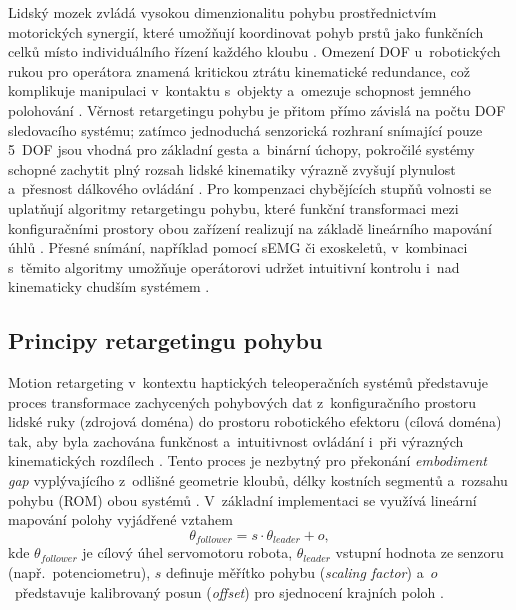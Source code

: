 \documentclass[FZS,DP]{tulthesis}
\begin{document}
Lidský mozek zvládá vysokou dimenzionalitu pohybu prostřednictvím motorických synergií, které umožňují koordinovat pohyb prstů jako funkčních celků místo individuálního řízení každého kloubu \cite{Mizrahi2023, Xiong2024, Zhang2025}.
Omezení DOF u~robotických rukou pro operátora znamená kritickou ztrátu kinematické redundance, což komplikuje manipulaci v~kontaktu s~objekty a~omezuje schopnost jemného polohování \cite{Belcamino2024, GIUDICI2025}.
Věrnost retargetingu pohybu je přitom přímo závislá na počtu DOF sledovacího systému; zatímco jednoduchá senzorická rozhraní snímající pouze 5~DOF jsou vhodná pro základní gesta a~binární úchopy, pokročilé systémy schopné zachytit plný rozsah lidské kinematiky výrazně zvyšují plynulost a~přesnost dálkového ovládání \cite{Belcamino2024, Zhang2025}.
Pro kompenzaci chybějících stupňů volnosti se uplatňují algoritmy retargetingu pohybu, které funkční transformaci mezi konfiguračními prostory obou zařízení realizují na základě lineárního mapování úhlů \cite{Zhang2025, Mizrahi2023, GIUDICI2025}.
Přesné snímání, například pomocí sEMG či exoskeletů, v~kombinaci s~těmito algoritmy umožňuje operátorovi udržet intuitivní kontrolu i~nad kinematicky chudším systémem \cite{Xiong2024, Mizrahi2023, GIUDICI2025}.

\subsection{Principy retargetingu pohybu}
Motion retargeting v~kontextu haptických teleoperačních systémů představuje proces transformace zachycených pohybových dat z~konfiguračního prostoru lidské ruky (zdrojová doména) do prostoru robotického efektoru (cílová doména) tak, aby byla zachována funkčnost a~intuitivnost ovládání i~při výrazných kinematických rozdílech \cite{GIUDICI2025, Zhang2025}.
Tento proces je nezbytný pro překonání \textit{embodiment gap} vyplývajícího z~odlišné geometrie kloubů, délky kostních segmentů a~rozsahu pohybu (ROM) obou systémů \cite{Coppola2022920, GIUDICI2025, Zhang2025}.
V~základní implementaci se využívá lineární mapování polohy vyjádřené vztahem
%
\begin{equation}
    \theta_{follower} = s \cdot \theta_{leader} + o,
\end{equation}
%
kde $\theta_{follower}$ je cílový úhel servomotoru robota, $\theta_{leader}$ vstupní hodnota ze senzoru (např.\ potenciometru), $s$ definuje měřítko pohybu (\textit{scaling factor}) a~$o$~představuje kalibrovaný posun (\textit{offset}) pro sjednocení krajních poloh \cite{Mizrahi2023, Zhang2025}.
\end{document}

